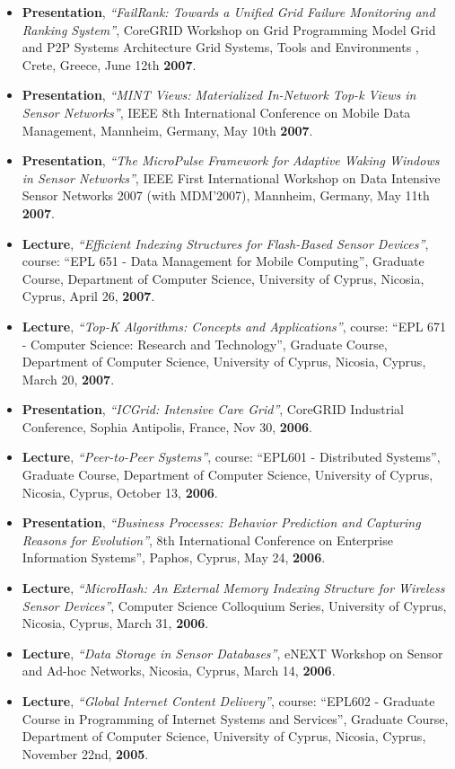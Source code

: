 \documentclass[10pt]{article}
\begin{document}
\begin{itemize}
\item  {\bf Presentation}, {\em ``FailRank: Towards a Unified Grid Failure Monitoring and Ranking System''}, CoreGRID Workshop on Grid Programming Model Grid and P2P Systems Architecture Grid Systems, Tools and Environments , Crete, Greece, June 12th {\bf 2007}.
\item  {\bf Presentation}, {\em ``MINT Views: Materialized In-Network Top-k Views in Sensor Networks''}, IEEE 8th International Conference on Mobile Data Management, Mannheim, Germany, May 10th {\bf 2007}.
\item  {\bf Presentation}, {\em ``The MicroPulse Framework for Adaptive Waking Windows in Sensor Networks''}, IEEE First International Workshop on Data Intensive Sensor Networks 2007 (with MDM'2007), Mannheim, Germany, May 11th {\bf 2007}. 
\item  {\bf Lecture}, {\em ``Efficient Indexing Structures for Flash-Based Sensor Devices''}, course: ``EPL 651 -  Data Management for Mobile Computing'', Graduate Course, Department of Computer Science, University of Cyprus,  Nicosia, Cyprus, April 26, {\bf 2007}.
\item  {\bf Lecture}, {\em ``Top-K Algorithms: Concepts and Applications''}, course: ``EPL 671 -  Computer Science: Research and Technology'', Graduate Course, Department of Computer Science, University of Cyprus,  Nicosia, Cyprus, March 20, {\bf 2007}.
\item  {\bf Presentation}, {\em ``ICGrid: Intensive Care Grid''}, CoreGRID Industrial Conference, Sophia Antipolis, France, Nov 30, {\bf 2006}.
\item  {\bf Lecture}, {\em ``Peer-to-Peer Systems''}, course: ``EPL601 - Distributed Systems'', Graduate Course, Department of Computer Science, University of Cyprus,  Nicosia, Cyprus, October 13, {\bf 2006}.
\item  {\bf Presentation}, {\em ``Business Processes: Behavior Prediction and Capturing Reasons for Evolution''}, 8th International Conference on Enterprise Information Systems'', Paphos, Cyprus, May 24, {\bf 2006}.
\item  {\bf Lecture}, {\em ``MicroHash: An External Memory Indexing Structure for Wireless Sensor Devices''},  Computer Science Colloquium Series, University of Cyprus, Nicosia, Cyprus, March 31, {\bf 2006}.
\item  {\bf Lecture}, {\em ``Data Storage in Sensor Databases''}, eNEXT Workshop on Sensor and Ad-hoc Networks, Nicosia, Cyprus, March 14, {\bf 2006}.
\item  {\bf Lecture}, {\em ``Global Internet Content Delivery''}, course: ``EPL602 - Graduate Course in Programming of Internet Systems and Services'', Graduate Course, Department of Computer Science, University of Cyprus,  Nicosia, Cyprus, November 22nd, {\bf 2005}.

\end{itemize}
\end{document}
